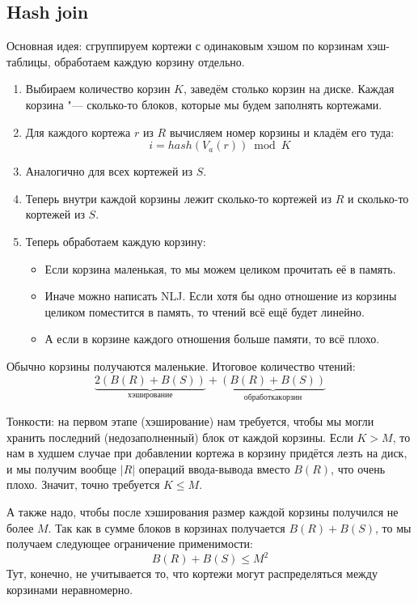 \subsection{Hash join}
	Основная идея: сгруппируем кортежи с одинаковым хэшом по корзинам хэш-таблицы,
	обработаем каждую корзину отдельно.
	\begin{enumerate}
		\item
			Выбираем количество корзин $K$, заведём столько корзин на диске.
			Каждая корзина "--- сколько-то блоков, которые мы будем заполнять кортежами.
		\item Для каждого кортежа $r$ из $R$ вычисляем номер корзины и кладём его туда:
			\[ i = hash(V_a(r)) \bmod K \]
		\item Аналогично для всех кортежей из $S$.
		\item Теперь внутри каждой корзины лежит сколько-то кортежей из $R$ и сколько-то кортежей из $S$.
		\item Теперь обработаем каждую корзину:
			\begin{itemize}
				\item Если корзина маленькая, то мы можем целиком прочитать её в память.
				\item Иначе можно написать NLJ. Если хотя бы одно отношение из корзины целиком поместится в память, то чтений всё ещё будет линейно.
				\item А если в корзине каждого отношения больше памяти, то всё плохо.
			\end{itemize}
	\end{enumerate}
	Обычно корзины получаются маленькие.
	Итоговое количество чтений:
	\[
		\underbrace{2(B(R)+B(S))}_{хэширование} + \underbrace{(B(R)+B(S))}_{обработка корзин}
	\]

	Тонкости: на первом этапе (хэширование) нам требуется, чтобы мы могли хранить
	последний (недозаполненный) блок от каждой корзины.
	Если $K > M$, то нам в худшем случае при добавлении кортежа в корзину придётся лезть на диск,
	и мы получим вообще $|R|$ операций ввода-вывода вместо $B(R)$, что очень плохо.
	Значит, точно требуется $K \le M$.

	А также надо, чтобы после хэширования размер каждой корзины получился не более $M$.
	Так как в сумме блоков в корзинах получается $B(R)+B(S)$, то мы получаем следующее ограничение применимости:
	\[ B(R)+B(S) \le M^2 \]
	Тут, конечно, не учитывается то, что кортежи могут распределяться между корзинами неравномерно.
